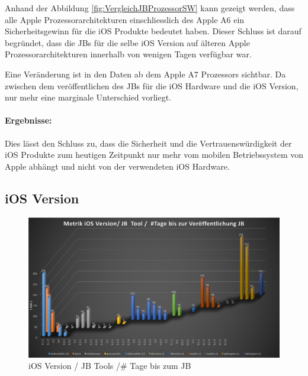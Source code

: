 Anhand der Abbildung \ref{fig:VergleichJBProzessorSW} kann gezeigt werden, dass alle Apple Prozessorarchitekturen einschliesslich des Apple A6 ein Sicherheitsgewinn für die iOS Produkte bedeutet haben. Dieser Schluss ist darauf begründet, dass die JBs für die selbe iOS Version auf älteren Apple Prozessorarchitekturen innerhalb von wenigen Tagen verfügbar war. \par 
Eine Veränderung ist in den Daten ab dem Apple A7 Prozessors sichtbar. Da zwischen dem veröffentlichen des JBs für die iOS Hardware und die iOS Version, nur mehr eine marginale Unterschied vorliegt.
\paragraph{Ergebnisse:} Dies lässt den Schluss zu, dass die Sicherheit und die Vertrauenswürdigkeit der iOS Produkte zum heutigen Zeitpunkt nur mehr vom mobilen Betriebssystem von Apple abhängt und nicht von der verwendeten iOS Hardware. 
%
\newpage
\subsection{iOS Version}
\label{sec:Frage1iOSVersion} 

\begin{figure}[hp!]
        \centering
                \includegraphics[scale=0.38]{Bilder/Frage1_1.png}
        \caption{iOS Version / JB Tools /\# Tage bis zum JB}
        \label{fig:AnalyseiOSJB1}        
\end{figure}

